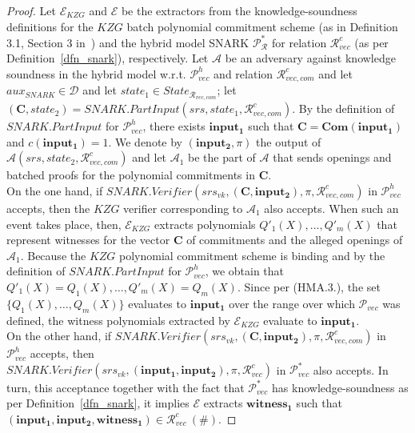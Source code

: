 \begin{proof} Let $\mathcal{E}_{\mathit{KZG}}$ and $\mathcal{E}$ be the extractors from the knowledge-soundness definitions for the 
$\mathit{KZG}$ batch polynomial commitment scheme (as in Definition 3.1, Section 3 in~\cite{plonk}) and the hybrid model 
SNARK $\mathscr{P}^*_{\mathcal{R}}$ for relation $\mathcal{R}^c_{\mathit{vec}}$ (as per Definition~\ref{dfn_snark}), respectively. 
Let $\mathcal{A}$ be an adversary against knowledge soundness in the hybrid model w.r.t. 
$\mathscr{P}_{\mathit{vec}}^{h}$ and relation $\mathcal{R}_{\mathit{vec}, \mathit{com}}^c$ and let $\mathit{aux}_{\mathit{SNARK}} \in \mathcal{D}$ 
and let $\mathit{state_1} \in \mathit{State}_{\mathcal{R}_{\mathit{vec}, \mathit{com}}}$; let 
$(\mathbf{C},\mathit{state_2}) = \mathit{SNARK.PartInput}(\mathit{srs}, \mathit{state_1}, \mathcal{R}_{\mathit{vec}, \mathit{com}}^c)$. 
By the definition of $\mathit{SNARK.PartInput}$ for $\mathscr{P}_{\mathit{vec}}^{h}$, there exists 
$\mathbf{input_1}$ such that $\mathbf{C} = \mathbf{Com}(\mathbf{input_1})$ and $c(\mathbf{input_1}) = 1$. 
We denote by $(\mathbf{input_2}, \pi)$ the output of $\mathcal{A}(\mathit{srs}, \mathit{state_2},  \mathcal{R}_{\mathit{vec}, \mathit{com}}^c)$ 
and let $\mathcal{A}_1$ be the part of $\mathcal{A}$ that sends openings and batched proofs for the polynomial commitments in 
$\mathbf{C}$. \\

\noindent On the one hand, if $\mathit{SNARK.Verifier}(\mathit{srs}_{\mathit{vk}}, (\mathbf{C},\mathbf{input_2}),\pi,\mathcal{R}_{\mathit{vec}, \mathit{com}}^c)$ 
in $\mathscr{P}_{\mathit{vec}}^{h}$ accepts, then the $\mathit{KZG}$ verifier corresponding to 
$\mathcal{A}_1$ also accepts. When such an event takes place, then, \ewnp $\mathcal{E}_{\mathit{KZG}}$ extracts polynomials 
$Q'_1(X), \ldots, Q'_m(X)$ that represent witnesses for the vector $\mathbf{C}$ of commitments and the alleged openings of $\mathcal{A}_1$. 
Because the $\mathit{KZG}$ polynomial commitment scheme is binding and by the definition of 
$\mathit{SNARK.PartInput}$ for $\mathscr{P}_{\mathit{vec}}^{h}$, we obtain that $Q'_1(X) = Q_1(X), \ldots, Q'_m(X) = Q_m(X).$ 
Since per (HMA.3.), the set $\{Q_1(X), \ldots, Q_m(X)\}$ evaluates to $\mathbf{input_1}$ over the range over which $\mathscr{P}_{\mathit{vec}}$ 
was defined, \ewnp the witness polynomials extracted by $\mathcal{E}_{\mathit{KZG}}$ evaluate to $\mathbf{input_1}$. \\

\noindent On the other hand, if $\mathit{SNARK.Verifier}(\mathit{srs}_{\mathit{vk}}, (\mathbf{C},\mathbf{input_2}),\pi,\mathcal{R}_{\mathit{vec}, \mathit{com}}^c)$ 
in $\mathscr{P}_{\mathit{vec}}^{h}$ accepts, then \\
$\mathit{SNARK.Verifier}(\mathit{srs}_{\mathit{vk}}, (\mathbf{input_1},\mathbf{input_2}),\pi,\mathcal{R}_{\mathit{vec}}^c)$ 
in $\mathscr{P}_{\mathit{vec}}^{*}$ also accepts. In turn, this acceptance together with the fact that $\mathscr{P}_{\mathit{vec}}^{*}$ 
has knowledge-soundness as per Definition~\ref{dfn_snark}, it implies $\mathcal{E}$ \ewnp extracts $\mathbf{witness_1}$ 
such that $(\mathbf{input_1}, \mathbf{input_2}, \mathbf{witness_1}) \in \mathcal{R}_{\mathit{vec}}^{c} \ (\#).$ 


\end{proof}
